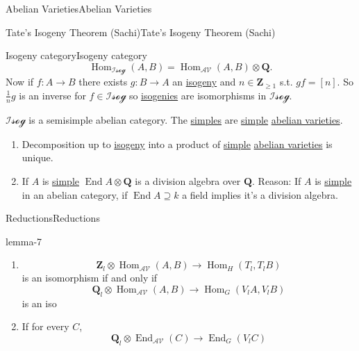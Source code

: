 \documentclass[10pt,]{book}
\numberwithin{equation}{section}
\newcommand{\lb}{[}
\newcommand{\rb}{]}
\newcommand{\ZZ}{\mathbf{Z}}
\newcommand{\QQ}{\mathbf{Q}}
\newcommand{\cat}[1]{\mathcal{#1}}
\DeclareMathOperator{\End}{End}
\DeclareMathOperator{\Hom}{Hom}
\begin{document}
\begin{chapterptx}{Abelian Varieties}{}{Abelian Varieties}{}{}
\begin{sectionptx}{Tate's Isogeny Theorem (Sachi)}{}{Tate's Isogeny Theorem (Sachi)}{}{}
\begin{subsectionptx}{Isogeny category}{}{Isogeny category}{}{}
\begin{equation*}
\Hom_{\cat{Isog}}(A,B) = \Hom_\cat{AV}(A,B)\otimes \QQ\text{.}
\end{equation*}
Now if \(f \colon A \to B\) there exists \(g\colon B \to A\) an \hyperref[def-supersing-isog-isog]{isogeny} and \(n\in \ZZ_{\ge 1}\) s.t. \(gf = \lb n \rb\). So \(\frac 1n g\) is an inverse for \(f \in \cat{Isog}\) so \hyperref[def-supersing-isog-isog]{isogenies} are isomorphisms in \(\cat{Isog}\).%
\par
\hypertarget{p-384}{}%
\(\cat{Isog}\) is a semisimple abelian category. The \hyperref[def-simple-av]{simples} are \hyperref[def-simple-av]{simple} \hyperref[def-buntes-abvar]{abelian varieties}.\leavevmode%
\begin{enumerate}
\item\hypertarget{li-71}{}Decomposition up to \hyperref[def-supersing-isog-isog]{isogeny} into a product of \hyperref[def-simple-av]{simple} \hyperref[def-buntes-abvar]{abelian varieties} is unique.%
\item\hypertarget{li-72}{}If \(A\) is \hyperref[def-simple-av]{simple} \(\End A \otimes \QQ\) is a division algebra over \(\QQ\). Reason: If \(A\) is \hyperref[def-simple-av]{simple} in an abelian category, if \(\End A \supseteq k\) a field implies it's a division algebra.%
\end{enumerate}
%
\end{subsectionptx}
%
%
\typeout{************************************************}
\typeout{************************************************}
%
\begin{subsectionptx}{Reductions}{}{Reductions}{}{}\label{subsection-34}
\begin{lemma}{}{}{lemma-7}%
\hypertarget{p-385}{}%
\leavevmode%
\begin{enumerate}
\item\hypertarget{li-73}{}%
\begin{equation*}
\ZZ_l \otimes \Hom_\cat{AV} (A,B) \to \Hom_H(T_l, T_lB)
\end{equation*}
is an isomorphism if and only if%
\begin{equation*}
\QQ_l \otimes \Hom_\cat{AV} (A,B) \to \Hom_G(V_l A, V_l B)
\end{equation*}
is an iso%
\item\hypertarget{li-74}{}If for every \(C\),%
\begin{equation*}
\QQ_l \otimes \End_\cat{AV} (C) \to \End_G(V_l C)
\end{equation*}

\end{enumerate}
\end{lemma}
\end{subsectionptx}
\end{sectionptx}
\end{chapterptx}
\end{document}
